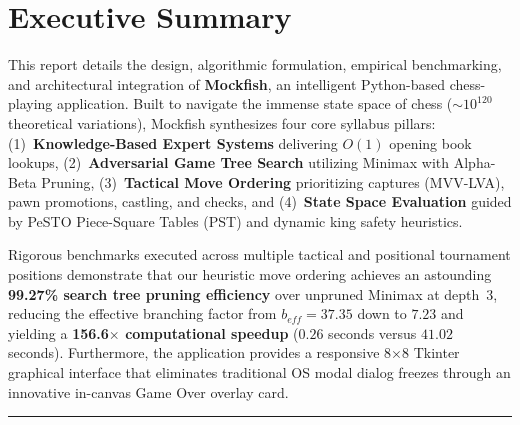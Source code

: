 \documentclass[11pt,a4paper]{article}
\begin{document}
\begin{titlepage}
    \vfill
\end{titlepage}

\setcounter{page}{2}

\section*{Executive Summary}

This report details the design, algorithmic formulation, empirical benchmarking, and architectural integration of \textbf{Mockfish}, an intelligent Python-based chess-playing application. Built to navigate the immense state space of chess ($\sim 10^{120}$ theoretical variations), Mockfish synthesizes four core syllabus pillars: (1)~\textbf{Knowledge-Based Expert Systems} delivering $O(1)$ opening book lookups, (2)~\textbf{Adversarial Game Tree Search} utilizing Minimax with Alpha-Beta Pruning, (3)~\textbf{Tactical Move Ordering} prioritizing captures (MVV-LVA), pawn promotions, castling, and checks, and (4)~\textbf{State Space Evaluation} guided by PeSTO Piece-Square Tables (PST) and dynamic king safety heuristics.

Rigorous benchmarks executed across multiple tactical and positional tournament positions demonstrate that our heuristic move ordering achieves an astounding \textbf{99.27\% search tree pruning efficiency} over unpruned Minimax at depth~3, reducing the effective branching factor from $b_{eff} = 37.35$ down to $7.23$ and yielding a \textbf{156.6$\times$ computational speedup} ($0.26$ seconds versus $41.02$ seconds). Furthermore, the application provides a responsive 8$\times$8 Tkinter graphical interface that eliminates traditional OS modal dialog freezes through an innovative in-canvas Game Over overlay card.

\vspace{0.4cm}
\hrule
\vspace{0.4cm}

\tableofcontents
\newpage

\setcounter{page}{1}
\end{document}
